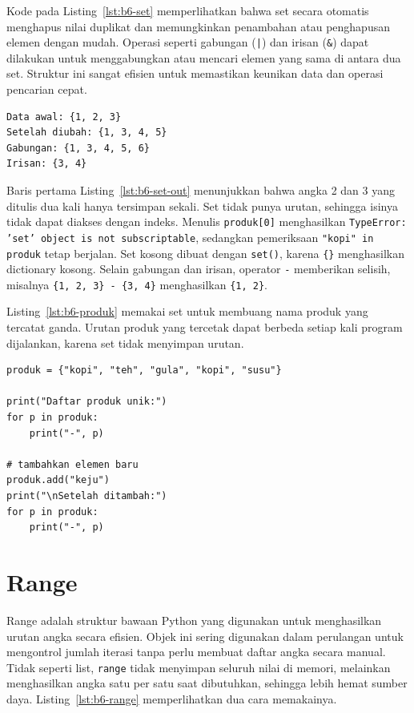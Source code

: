 Kode pada Listing~\ref{lst:b6-set} memperlihatkan bahwa set secara otomatis menghapus nilai duplikat 
dan memungkinkan penambahan atau penghapusan elemen dengan mudah. 
Operasi seperti gabungan (\texttt{|}) dan irisan (\texttt{\&}) dapat dilakukan untuk menggabungkan atau mencari elemen yang sama di antara dua set. 
Struktur ini sangat efisien untuk memastikan keunikan data dan operasi pencarian cepat.

\begin{lstlisting}[language=bash, caption={Keluaran kode operasi set}, label={lst:b6-set-out}]
Data awal: {1, 2, 3}
Setelah diubah: {1, 3, 4, 5}
Gabungan: {1, 3, 4, 5, 6}
Irisan: {3, 4}
\end{lstlisting}

Baris pertama Listing~\ref{lst:b6-set-out} menunjukkan bahwa angka 2 dan 3 yang ditulis dua kali hanya tersimpan sekali. Set tidak punya urutan, sehingga isinya tidak dapat diakses dengan indeks. Menulis \texttt{produk[0]} menghasilkan \texttt{TypeError: 'set' object is not subscriptable}, sedangkan pemeriksaan \texttt{"kopi" in produk} tetap berjalan. Set kosong dibuat dengan \texttt{set()}, karena \texttt{\{\}} menghasilkan dictionary kosong. Selain gabungan dan irisan, operator \texttt{-} memberikan selisih, misalnya \texttt{\{1, 2, 3\} - \{3, 4\}} menghasilkan \texttt{\{1, 2\}}.

Listing~\ref{lst:b6-produk} memakai set untuk membuang nama produk yang tercatat ganda. Urutan produk yang tercetak dapat berbeda setiap kali program dijalankan, karena set tidak menyimpan urutan.


\begin{lstlisting}[style=PythonStyle, caption={Menyaring nama produk unik dengan set}, label={lst:b6-produk}]
produk = {"kopi", "teh", "gula", "kopi", "susu"}

print("Daftar produk unik:")
for p in produk:
    print("-", p)

# tambahkan elemen baru
produk.add("keju")
print("\nSetelah ditambah:")
for p in produk:
    print("-", p)
\end{lstlisting}


\section{Range}
Range adalah struktur bawaan Python yang digunakan untuk menghasilkan urutan angka secara efisien. 
Objek ini sering digunakan dalam perulangan untuk mengontrol jumlah iterasi tanpa perlu membuat daftar angka secara manual. 
Tidak seperti list, \texttt{range} tidak menyimpan seluruh nilai di memori, melainkan menghasilkan angka satu per satu saat dibutuhkan, sehingga lebih hemat sumber daya. Listing~\ref{lst:b6-range} memperlihatkan dua cara memakainya.

